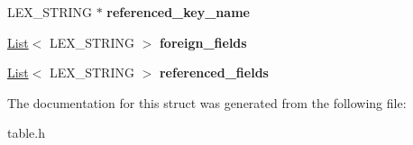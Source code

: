 \begin{DoxyCompactItemize}
L\+E\+X\+\_\+\+S\+T\+R\+I\+NG $\ast$ {\bfseries referenced\+\_\+key\+\_\+name}
\item 
\mbox{\label{structst__foreign__key__info_ad53d0f47f31e531d3a3ad443bf254941}} 
\mbox{\hyperlink{classList}{List}}$<$ L\+E\+X\+\_\+\+S\+T\+R\+I\+NG $>$ {\bfseries foreign\+\_\+fields}
\item 
\mbox{\label{structst__foreign__key__info_aebfedd10f68dc0d9d02ac6aa4a38c495}} 
\mbox{\hyperlink{classList}{List}}$<$ L\+E\+X\+\_\+\+S\+T\+R\+I\+NG $>$ {\bfseries referenced\+\_\+fields}
\end{DoxyCompactItemize}


The documentation for this struct was generated from the following file\+:\begin{DoxyCompactItemize}
\item 
table.\+h\end{DoxyCompactItemize}
